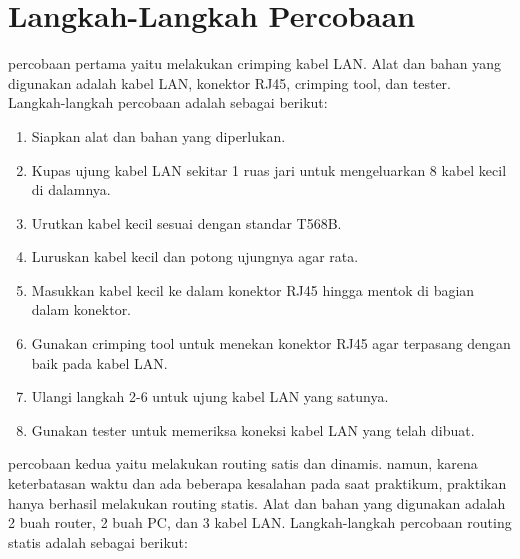 \section{Langkah-Langkah Percobaan}
percobaan pertama yaitu melakukan crimping kabel LAN. Alat dan bahan yang digunakan adalah kabel LAN, konektor RJ45, crimping tool, dan tester. Langkah-langkah percobaan adalah sebagai berikut:
\begin{enumerate}
    \item Siapkan alat dan bahan yang diperlukan.
    \item Kupas ujung kabel LAN sekitar 1 ruas jari untuk mengeluarkan 8 kabel kecil di dalamnya.
    \item Urutkan kabel kecil sesuai dengan standar T568B.
    \item Luruskan kabel kecil dan potong ujungnya agar rata.
    \item Masukkan kabel kecil ke dalam konektor RJ45 hingga mentok di bagian dalam konektor.
    \item Gunakan crimping tool untuk menekan konektor RJ45 agar terpasang dengan baik pada kabel LAN.
    \item Ulangi langkah 2-6 untuk ujung kabel LAN yang satunya.
    \item Gunakan tester untuk memeriksa koneksi kabel LAN yang telah dibuat.
\end{enumerate}
percobaan kedua yaitu melakukan routing satis dan dinamis. namun, karena keterbatasan waktu dan ada beberapa kesalahan pada saat praktikum, praktikan hanya berhasil melakukan routing statis. Alat dan bahan yang digunakan adalah 2 buah router, 2 buah PC, dan 3 kabel LAN. Langkah-langkah percobaan routing statis adalah sebagai berikut:

